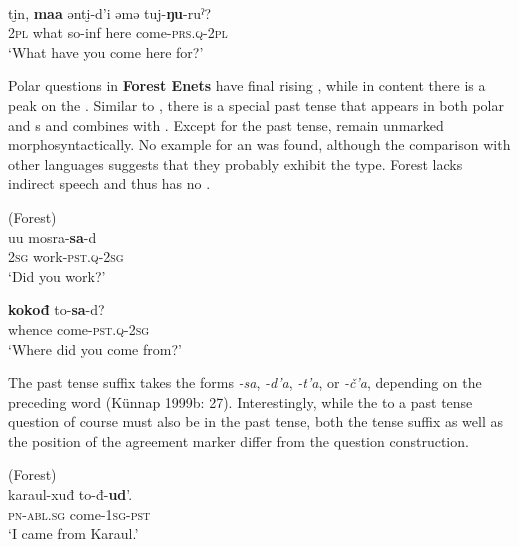 \ea%
    \label{ex:ural:3}
    \\
    \gll ti̮{n,} \textbf{{maa}} ənti̮-d’i    əmə  tuj-\textbf{{ŋu}}{-ruˀ?}\\
    2\textsc{pl}  what  so-inf    here  come-\textsc{prs}.\textsc{q}-2\textsc{pl}\\
    \glt ‘What have you come here for?’ \citep[121]{Gusev2015a}
    \z

Polar questions in \textbf{Forest Enets} have final rising , while in content  there is a peak on the  \citep[353]{Siegl2013}. Similar to , there is a special past tense  that appears in both polar and s and combines with  . Except for the past tense,  remain unmarked morphosyntactically. No example for an  was found, although the comparison with other  languages suggests that they probably exhibit the  type. Forest  lacks indirect speech and thus has no  \citep[198]{Siegl2013}.

\ea%
    \label{ex:ural:4}
     (Forest)\\
    \ea
    \gll uu  mosra-\textbf{{sa}}{-d}\\
    2\textsc{sg}  work-\textsc{pst}.\textsc{q}-2\textsc{sg}\\
    \glt ‘Did you work?’ \citep[402]{Siegl2012}
    
    \ex
    \gll \textbf{{kokođ}} to-\textbf{{sa}}{-d}?\\
    whence  come-\textsc{pst}.\textsc{q}-2\textsc{sg}\\
    \glt ‘Where did you come from?’ \citep[355]{Siegl2013}
    \z
    \z

\noindent The past tense  suffix takes the forms \textit{-sa}, \textit{-d’a}, \textit{-t’a}, or \textit{-č’a}, depending on the preceding word (Künnap 1999b: 27). Interestingly, while the  to a past tense question of course must also be in the past tense, both the tense suffix as well as the position of the agreement marker differ from the question construction.

\ea%
    \label{ex:ural:5}
     (Forest)\\
    \gll karaul-xuđ to-đ-\textbf{{ud}}{’.}\\
    \textsc{pn}-\textsc{abl}.\textsc{sg}  come-1\textsc{sg}-\textsc{pst}\\
    \glt ‘I came from Karaul.’ \citep[404]{Siegl2012}
    \z


